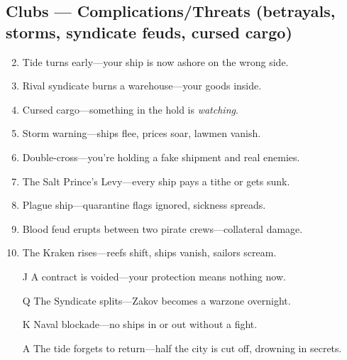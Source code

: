 \subsection*{Clubs --- Complications/Threats (betrayals, storms, syndicate feuds, cursed cargo)}
\begin{enumerate}
\setcounter{enumi}{1}
\item Tide turns early---your ship is now ashore on the wrong side.
\item Rival syndicate burns a warehouse---your goods inside.
\item Cursed cargo---something in the hold is \textit{watching}.
\item Storm warning---ships flee, prices soar, lawmen vanish.
\item Double-cross---you're holding a fake shipment and real enemies.
\item The Salt Prince's Levy---every ship pays a tithe or gets sunk.
\item Plague ship---quarantine flags ignored, sickness spreads.
\item Blood feud erupts between two pirate crews---collateral damage.
\item The Kraken rises---reefs shift, ships vanish, sailors scream.
\item[J] A contract is voided---your protection means nothing now.
\item[Q] The Syndicate splits---Zakov becomes a warzone overnight.
\item[K] Naval blockade---no ships in or out without a fight.
\item[A] The tide forgets to return---half the city is cut off, drowning in secrets.
\end{enumerate}

